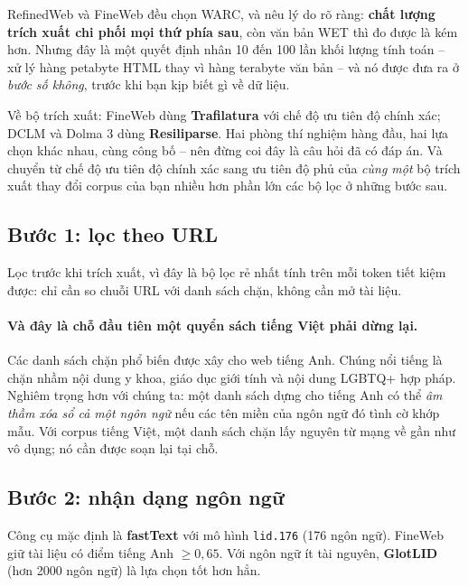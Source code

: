 RefinedWeb và FineWeb đều chọn WARC, và nêu lý do rõ ràng: \textbf{chất lượng trích xuất chi phối mọi thứ phía sau}, còn văn bản WET thì đo được là kém hơn. Nhưng đây là một quyết định nhân 10 đến 100 lần khối lượng tính toán -- xử lý hàng petabyte HTML thay vì hàng terabyte văn bản -- và nó được đưa ra ở \emph{bước số không}, trước khi bạn kịp biết gì về dữ liệu.

Về bộ trích xuất: FineWeb dùng \textbf{Trafilatura} với chế độ ưu tiên độ chính xác; DCLM và Dolma 3 dùng \textbf{Resiliparse}. Hai phòng thí nghiệm hàng đầu, hai lựa chọn khác nhau, cùng công bố -- nên đừng coi đây là câu hỏi đã có đáp án. Và chuyển từ chế độ ưu tiên độ chính xác sang ưu tiên độ phủ của \emph{cùng một} bộ trích xuất thay đổi corpus của bạn nhiều hơn phần lớn các bộ lọc ở những bước sau.

\subsection{Bước 1: lọc theo URL}
\label{ssec:url_filter}

Lọc trước khi trích xuất, vì đây là bộ lọc rẻ nhất tính trên mỗi token tiết kiệm được: chỉ cần so chuỗi URL với danh sách chặn, không cần mở tài liệu.

\paragraph{Và đây là chỗ đầu tiên một quyển sách tiếng Việt phải dừng lại.} Các danh sách chặn phổ biến được xây cho web tiếng Anh. Chúng nổi tiếng là chặn nhầm nội dung y khoa, giáo dục giới tính và nội dung LGBTQ+ hợp pháp. Nghiêm trọng hơn với chúng ta: một danh sách dựng cho tiếng Anh có thể \emph{âm thầm xóa sổ cả một ngôn ngữ} nếu các tên miền của ngôn ngữ đó tình cờ khớp mẫu. Với corpus tiếng Việt, một danh sách chặn lấy nguyên từ mạng về gần như vô dụng; nó cần được soạn lại tại chỗ.

\subsection{Bước 2: nhận dạng ngôn ngữ}
\label{ssec:lid}

Công cụ mặc định là \textbf{fastText} với mô hình \texttt{lid.176} (176 ngôn ngữ). FineWeb giữ tài liệu có điểm tiếng Anh $\ge 0{,}65$. Với ngôn ngữ ít tài nguyên, \textbf{GlotLID} (hơn 2000 ngôn ngữ) là lựa chọn tốt hơn hẳn.

